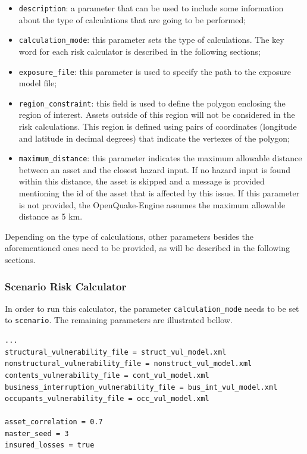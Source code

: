 \begin{itemize}
\item  \Verb+description+: a parameter that can be used to include some information about the type of calculations that are going to be performed;
\item  \Verb+calculation_mode+: this parameter sets the type of calculations. The key word for each risk calculator is described in the following sections;
\item  \Verb+exposure_file+: this parameter is used to specify the path to the \gls{exposure model} file;
\item  \Verb+region_constraint+: this field is used to define the polygon enclosing the region of interest. Assets outside of this region will not be considered in the risk calculations. This region is defined using pairs of coordinates (longitude and latitude in decimal degrees) that indicate the vertexes of the polygon;
\item  \Verb+maximum_distance+: this parameter indicates the maximum allowable distance between an \gls{asset} and the closest hazard input. If no hazard input is found within this distance, the \gls{asset} is skipped and a message is provided mentioning the id of the asset that is affected by this issue. If this parameter is not provided, the OpenQuake-Engine assumes the maximum allowable distance as 5 km.
\end{itemize}

Depending on the type of calculations, other parameters besides the aforementioned ones need to be provided, as will be described in the following sections.

\subsubsection{Scenario Risk Calculator}
In order to run this calculator, the parameter \Verb+calculation_mode+ needs to be set to \Verb+scenario+. The remaining parameters are illustrated bellow.

\begin{Verbatim}[frame=single, commandchars=\\\{\}, samepage=true]
...
structural_vulnerability_file = struct_vul_model.xml
nonstructural_vulnerability_file = nonstruct_vul_model.xml
contents_vulnerability_file = cont_vul_model.xml
business_interruption_vulnerability_file = bus_int_vul_model.xml
occupants_vulnerability_file = occ_vul_model.xml

asset_correlation = 0.7
master_seed = 3
insured_losses = true
\end{Verbatim}

